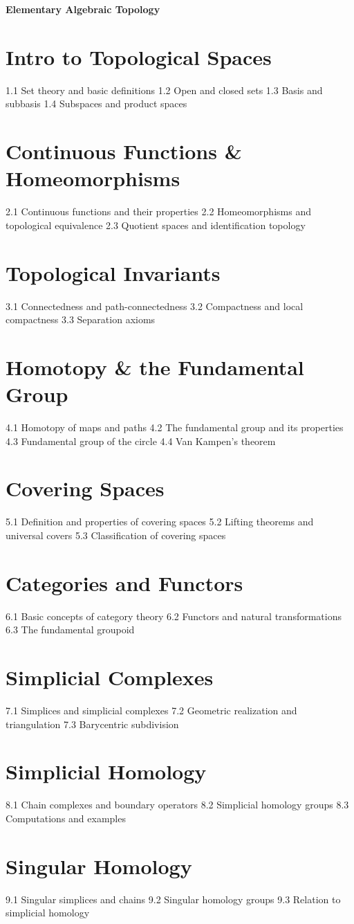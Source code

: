 {\LARGE \bf{Elementary Algebraic Topology}}
\section{Intro to Topological Spaces}
1.1 Set theory and basic definitions
1.2 Open and closed sets
1.3 Basis and subbasis
1.4 Subspaces and product spaces
\section{Continuous Functions \& Homeomorphisms}
2.1 Continuous functions and their properties
2.2 Homeomorphisms and topological equivalence
2.3 Quotient spaces and identification topology
\section{Topological Invariants}
3.1 Connectedness and path-connectedness
3.2 Compactness and local compactness
3.3 Separation axioms
\section{Homotopy \& the Fundamental Group}
4.1 Homotopy of maps and paths
4.2 The fundamental group and its properties
4.3 Fundamental group of the circle
4.4 Van Kampen's theorem
\section{Covering Spaces}
5.1 Definition and properties of covering spaces
5.2 Lifting theorems and universal covers
5.3 Classification of covering spaces
\section{Categories and Functors}
6.1 Basic concepts of category theory
6.2 Functors and natural transformations
6.3 The fundamental groupoid
\section{Simplicial Complexes}
7.1 Simplices and simplicial complexes
7.2 Geometric realization and triangulation
7.3 Barycentric subdivision
\section{Simplicial Homology}
8.1 Chain complexes and boundary operators
8.2 Simplicial homology groups
8.3 Computations and examples
\section{Singular Homology}
9.1 Singular simplices and chains
9.2 Singular homology groups
9.3 Relation to simplicial homology
